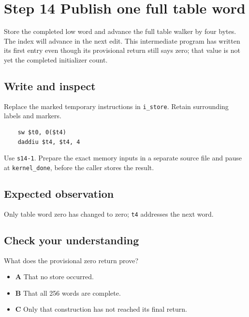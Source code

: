 \section{Step 14 Publish one full table word}\label{crc-s14}

Store the completed low word and advance the full table walker by four bytes. The index will advance in the next edit. This intermediate program has written its first entry even though its provisional return still says zero; that value is not yet the completed initializer count.

\subsection{Write and inspect}
Replace the marked temporary instructions in \texttt{i\_store}. Retain surrounding labels and markers.

\begin{verbatim}
    sw $t0, 0($t4)
    daddiu $t4, $t4, 4
\end{verbatim}

Use \texttt{s14-1}. Prepare the exact memory inputs in a separate source file and pause at \texttt{kernel\_done}, before the caller stores the result.

\subsection{Expected observation}
Only table word zero has changed to zero; \texttt{t4} addresses the next word.

\subsection{Check your understanding}
What does the provisional zero return prove?

\begin{itemize}
\item \textbf{A} That no store occurred.
\item \textbf{B} That all 256 words are complete.
\item \textbf{C} Only that construction has not reached its final return.
\end{itemize}
